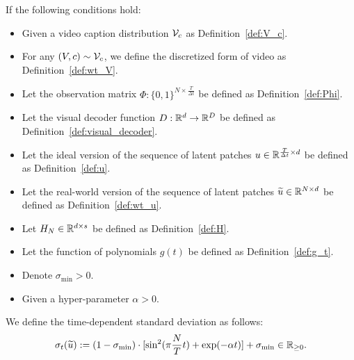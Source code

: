 \begin{definition}\label{def:sigma}
    If the following conditions hold:
    \begin{itemize}
        \item Given a video caption distribution ${\cal V}_c$ as Definition~\ref{def:V_c}.
        \item For any $(V, c) \sim {\cal V}_c$, we define the discretized form of video as Definition~\ref{def:wt_V}.
        \item Let the observation matrix $\Phi: \{0, 1\}^{N \times \frac{T}{\Delta t}}$ be defined as Definition~\ref{def:Phi}.
        \item Let the visual decoder function $D: \mathbb{R}^d \rightarrow \mathbb{R}^D$ be defined as Definition~\ref{def:visual_decoder}.
        \item Let the ideal version of the sequence of latent patches $u \in \mathbb{R}^{\frac{T}{\Delta t} \times d}$ be defined as Definition~\ref{def:u}.
        \item Let the real-world version of the sequence of latent patches $\widetilde{u} \in \mathbb{R}^{N \times d}$ be defined as Definition~\ref{def:wt_u}.
        \item Let $H_N \in \mathbb{R}^{d \times s}$ be defined as Definition~\ref{def:H}.
        \item Let the function of polynomials $g(t)$ be defined as Definition~\ref{def:g_t}.
        \item Denote $\sigma_{\min} > 0$.
        \item Given a hyper-parameter $\alpha > 0$.
    \end{itemize}
    We define  the time-dependent standard deviation as follows:
    \begin{align*}
        \sigma_t(\widetilde{u}) := (1 - \sigma_{\min}) \cdot [\sin^2( \pi \frac{N}{T} t ) +  \exp(-\alpha t) ] + \sigma_{\min} \in \mathbb{R}_{\ge 0}.
    \end{align*}
\end{definition}

